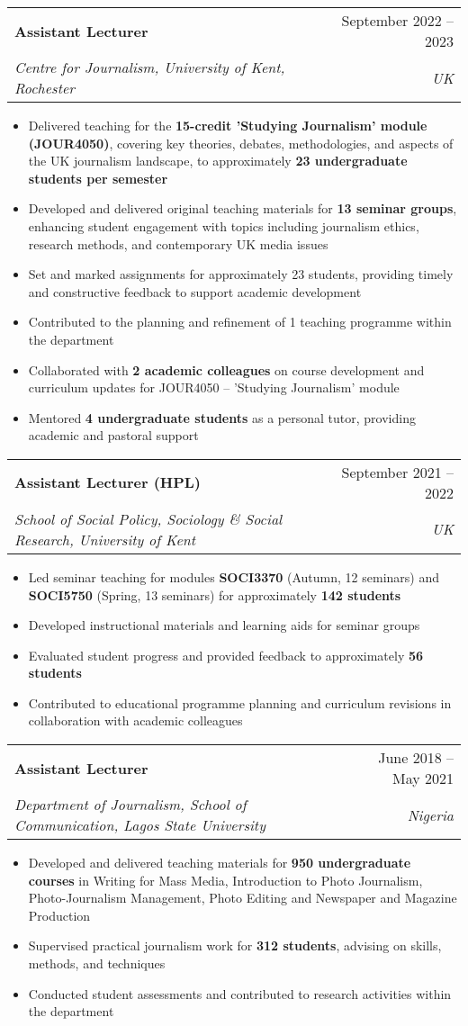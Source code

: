 \documentclass[a4paper,11pt]{article}
\makeatletter
\newcommand{\resumeItem}[1]{
  \item\small{
    {#1 \vspace{-2pt}}
  }
}
\newcommand{\resumeSubheading}[4]{
  \vspace{-2pt}\item
    \begin{tabular*}{0.97\textwidth}[t]{l@{\extracolsep{\fill}}r}
      \textbf{#1} & #2 \\
      \textit{\small#3} & \textit{\small #4} \\
    \end{tabular*}\vspace{-7pt}
}
\newcommand{\resumeItemListStart}{\begin{itemize}}
\newcommand{\resumeItemListEnd}{\end{itemize}\vspace{-5pt}}
\makeatother
\begin{document}
    \resumeSubheading
      {Assistant Lecturer}{September 2022 -- 2023}
      {Centre for Journalism, University of Kent, Rochester}{UK}
      \resumeItemListStart
        \resumeItem{Delivered teaching for the \textbf{15-credit 'Studying Journalism' module (JOUR4050)}, covering key theories, debates, methodologies, and aspects of the UK journalism landscape, to approximately \textbf{23 undergraduate students per semester}}
        \resumeItem{Developed and delivered original teaching materials for \textbf{13 seminar groups}, enhancing student engagement with topics including journalism ethics, research methods, and contemporary UK media issues}
        \resumeItem{Set and marked assignments for approximately 23 students, providing timely and constructive feedback to support academic development}
        \resumeItem{Contributed to the planning and refinement of 1 teaching programme within the department}
        \resumeItem{Collaborated with \textbf{2 academic colleagues} on course development and curriculum updates for JOUR4050 -- 'Studying Journalism' module}
        \resumeItem{Mentored \textbf{4 undergraduate students} as a personal tutor, providing academic and pastoral support}
      \resumeItemListEnd

    \resumeSubheading
      {Assistant Lecturer (HPL)}{September 2021 -- 2022}
      {School of Social Policy, Sociology \& Social Research, University of Kent}{UK}
      \resumeItemListStart
        \resumeItem{Led seminar teaching for modules \textbf{SOCI3370} (Autumn, 12 seminars) and \textbf{SOCI5750} (Spring, 13 seminars) for approximately \textbf{142 students}}
        \resumeItem{Developed instructional materials and learning aids for seminar groups}
        \resumeItem{Evaluated student progress and provided feedback to approximately \textbf{56 students}}
        \resumeItem{Contributed to educational programme planning and curriculum revisions in collaboration with academic colleagues}
      \resumeItemListEnd

    \resumeSubheading
      {Assistant Lecturer}{June 2018 -- May 2021}
      {Department of Journalism, School of Communication, Lagos State University}{Nigeria}
      \resumeItemListStart
        \resumeItem{Developed and delivered teaching materials for \textbf{950 undergraduate courses} in Writing for Mass Media, Introduction to Photo Journalism, Photo-Journalism Management, Photo Editing and Newspaper and Magazine Production}
        \resumeItem{Supervised practical journalism work for \textbf{312 students}, advising on skills, methods, and techniques}
        \resumeItem{Conducted student assessments and contributed to research activities within the department}
      \resumeItemListEnd
\end{document}
